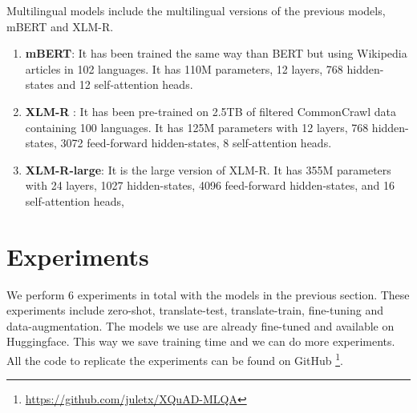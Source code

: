 \documentclass[11pt]{article}
\begin{document}
Multilingual models include the multilingual versions of the previous models, mBERT and XLM-R.

\begin{enumerate}
    \item \textbf{mBERT}: It has been trained the same way than BERT but using Wikipedia articles in 102 languages. It has 110M parameters, 12 layers, 768 hidden-states and 12 self-attention heads.
    \item \textbf{XLM-R} \cite{XLM-R}: It has been pre-trained on 2.5TB of filtered CommonCrawl data containing 100 languages. It has 125M parameters with 12 layers, 768 hidden-states, 3072 feed-forward hidden-states, 8 self-attention heads.
    \item \textbf{XLM-R-large}: It is the large version of XLM-R. It has 355M parameters with 24 layers, 1027 hidden-states, 4096 feed-forward hidden-states, and 16 self-attention heads,
\end{enumerate}

\section{Experiments}

We perform 6 experiments in total with the models in the previous section. These experiments include zero-shot, translate-test, translate-train, fine-tuning and data-augmentation. The models we use are already fine-tuned and available on Huggingface. This way we save training time and we can do more experiments. All the code to replicate the experiments can be found on GitHub \footnote{\url{https://github.com/juletx/XQuAD-MLQA}}.
\end{document}
